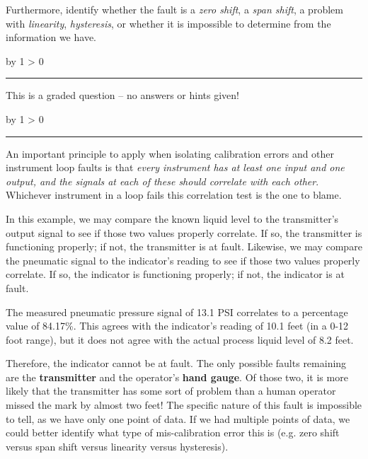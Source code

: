 \documentclass[12pt,a4paper]{article}
\def\svar{
           \advance\answnum by 1
           \ifnum \answnum > 0
                \hrule
                \vskip 3pt
                \leftline{Svar \the\answnum}
                \vskip 3pt \fi}
\def\notes{
           \advance\explnum by 1
           \ifnum \explnum > 0
                \hrule
                \vskip 3pt
                \leftline{Notes \the\explnum}
                \vskip 3pt \fi}
\begin{document}
Furthermore, identify whether the fault is a {\it zero shift}, a {\it span shift}, a problem with {\it linearity}, {\it hysteresis}, or whether it is impossible to determine from the information we have.

\vfil 

\eject
\vskip 10pt \filbreak 





\svar{} 

This is a graded question -- no answers or hints given!

\vskip 10pt \filbreak 





\notes{} 

An important principle to apply when isolating calibration errors and other instrument loop faults is that {\it every instrument has at least one input and one output, and the signals at each of these should correlate with each other}.  Whichever instrument in a loop fails this correlation test is the one to blame.

\vskip 10pt

In this example, we may compare the known liquid level to the transmitter's output signal to see if those two values properly correlate.  If so, the transmitter is functioning properly; if not, the transmitter is at fault.  Likewise, we may compare the pneumatic signal to the indicator's reading to see if those two values properly correlate.  If so, the indicator is functioning properly; if not, the indicator is at fault.

\vskip 10pt

The measured pneumatic pressure signal of 13.1 PSI correlates to a percentage value of 84.17\%.  This agrees with the indicator's reading of 10.1 feet (in a 0-12 foot range), but it does not agree with the actual process liquid level of 8.2 feet.

\vskip 10pt

Therefore, the indicator cannot be at fault.  The only possible faults remaining are the {\bf transmitter} and the operator's {\bf hand gauge}.  Of those two, it is more likely that the transmitter has some sort of problem than a human operator missed the mark by almost two feet!  The specific nature of this fault is impossible to tell, as we have only one point of data.  If we had multiple points of data, we could better identify what type of mis-calibration error this is (e.g. zero shift versus span shift versus linearity versus hysteresis).
\end{document}
